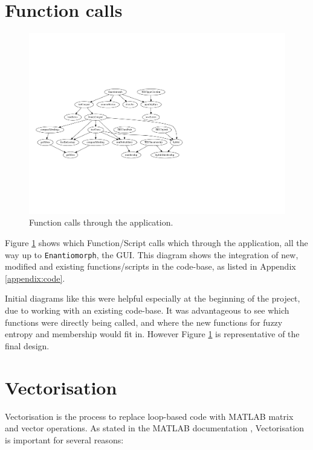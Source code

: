 \section{Function calls}

\begin{figure}[H]
  \centering
  \includegraphics[width=\textwidth,clip,trim=0mm 50mm 110mm 50mm]{Chapter2/software-img/function_call_1.pdf}
  \caption{Function calls through the application.}
  \label{fig:data-flow}
\end{figure}

Figure \ref{fig:data-flow} shows which Function/Script calls which through the application, all the way up to \texttt{Enantiomorph}, the \acrshort{GUI}. This diagram shows the integration of new, modified and existing functions/scripts in the code-base, as listed in Appendix \ref{appendix:code}.

Initial diagrams like this were helpful especially at the beginning of the project, due to working with an existing code-base. It was advantageous to see which functions were directly being called, and where the new functions for fuzzy entropy and membership would fit in. However Figure \ref{fig:data-flow} is representative of the final design.

\newpage
\section{Vectorisation}
\label{sec:vectorisation}

Vectorisation is the process to replace loop-based code with MATLAB matrix and vector operations. As stated in the MATLAB documentation \cite{vectorisation}, Vectorisation is important for several reasons:


